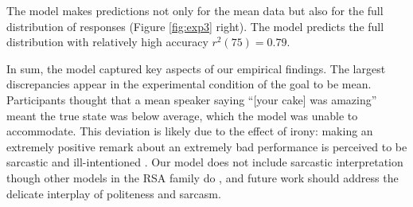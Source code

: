 \documentclass[10pt,letterpaper]{article}
\newcommand{\ndg}[1]{\textcolor{Green}{[ndg: #1]}}
\newcommand{\mht}[1]{\textcolor{DarkOrange}{[mht: #1]}}
\newcommand{\mcf}[1]{\textcolor{Red}{[mcf: #1]}}
\begin{document}
The model makes predictions not only for the mean data but also for the full distribution of responses (Figure \ref{fig:exp3} right).
The model predicts the full distribution with relatively high accuracy $r^2(75) = 0.79$.



In sum, the model captured key aspects of our empirical findings.
The largest discrepancies appear in the experimental condition of the goal to be mean.
Participants thought that a mean speaker saying ``[your cake] was amazing'' meant the true state was below average, which the model was unable to accommodate.
This deviation is likely due to the effect of irony: making an extremely positive remark about an extremely bad performance is perceived to be sarcastic and ill-intentioned \cite{colston1997}.
Our model does not include sarcastic interpretation though other models in the RSA family do \cite{Kao2015}, and future work should address the delicate interplay of politeness and sarcasm.

\end{document}
